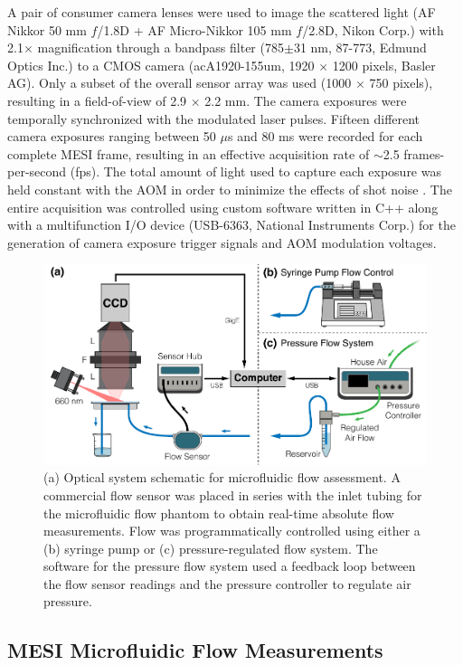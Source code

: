 \documentclass[12pt]{spieman}
\begin{document}
\begin{spacing}{2}
A pair of consumer camera lenses were used to image the scattered light (AF Nikkor 50 mm $f$/1.8D + AF Micro-Nikkor 105 mm $f$/2.8D, Nikon Corp.) with 2.1$\times$ magnification through a bandpass filter (785$\pm$31 nm, 87-773, Edmund Optics Inc.) to a CMOS camera (acA1920-155um, 1920 $\times$ 1200 pixels, Basler AG). Only a subset of the overall sensor array was used (1000 $\times$ 750 pixels), resulting in a field-of-view of 2.9 $\times$ 2.2 mm. The camera exposures were temporally synchronized with the modulated laser pulses. Fifteen different camera exposures ranging between 50 $\mu$s and 80 ms were recorded for each complete MESI frame, resulting in an effective acquisition rate of $\sim$2.5 frames-per-second (fps). The total amount of light used to capture each exposure was held constant with the AOM in order to minimize the effects of shot noise \cite{Parthasarathy:2008el}. The entire acquisition was controlled using custom software written in C++ along with a multifunction I/O device (USB-6363, National Instruments Corp.) for the generation of camera exposure trigger signals and AOM modulation voltages.

\begin{figure}
    \includegraphics[width=\textwidth]{Figure2.pdf}
    \caption {
        (a) Optical system schematic for microfluidic flow assessment. A commercial flow sensor was placed in series with the inlet tubing for the microfluidic flow phantom to obtain real-time absolute flow measurements. Flow was programmatically controlled using either a (b) syringe pump or (c) pressure-regulated flow system. The software for the pressure flow system used a feedback loop between the flow sensor readings and the pressure controller to regulate air pressure.
    }
    \label{fig:system}
\end{figure}


\subsection{MESI Microfluidic Flow Measurements}


\end{spacing}
\end{document}
